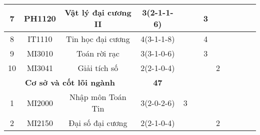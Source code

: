 \documentclass[12pt,a4paper]{report}
\begin{document}
\begin{landscape}
\begin{longtable}[c]{|c|c|c|c|c|c|c|c|c|c|c|c|}
        7                             & PH1120                          & Vật lý đại cương II                                          & 3(2-1-1-6)                                                                           &             &             & 3           &             &             &             &             &             \\ \hline
        8                             & IT1110                          & Tin học đại cương                                            & 4(3-1-1-8)                                                                           &             &             & 4           &             &             &             &             &             \\ \hline
        9                             & MI3010                          & Toán rời rạc                                                 & 3(3-1-0-6)                                                                           &             &             & 3           &             &             &             &             &             \\ \hline
        10                            & MI3041                          & Giải tích số                                                 & 2(2-1-0-4)                                                                           &             &             &             & 2           &             &             &             &             \\ \hline
        \multicolumn{3}{|c|}{\textbf{Cơ sở và cốt lõi ngành}}                                                                          & \textbf{47}                                                                          &             &             &             &             &             &             &             &             \\ \hline
        1                             & MI2000                          & Nhập môn Toán Tin                                            & 3(2-0-2-6)                                                                           & 3           &             &             &             &             &             &             &             \\ \hline
        2                             & MI2150                          & Đại số đại cương                                             & 2(2-1-0-4)                                                                           &             &             &             & 2           &             &             &             &             \\ \hline

\end{longtable}
\end{landscape}
\end{document}
